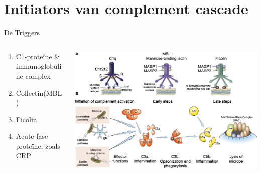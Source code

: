 \documentclass{beamer}
\begin{document}
\section{Initiators van complement cascade}
\begin{frame}{De Triggers}
	\begin{columns}
	\begin{column}{.5\textwidth}
	\begin{enumerate}
		\item C1-prote\"ine \& immunoglobuline complex
		\item Collectin(MBL)
		\item Ficolin
		\item Acute-fase prote\"ine, zoals CRP
	\end{enumerate}
\end{column}
\begin{column}{.5\textwidth}
	\includegraphics[width=\textwidth]{complement.png}
\end{column}
\end{columns}
\end{frame}

{\aauwavesbg
\begin{frame}
\end{frame}}
\end{document}
